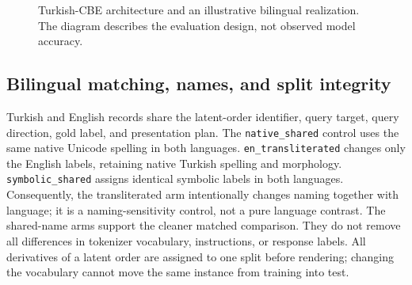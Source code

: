 \begin{figure}[t]
  \caption{Turkish-CBE architecture and an illustrative bilingual realization. The diagram describes the
  evaluation design, not observed model accuracy.}
  \label{fig:architecture}
\end{figure}

\subsection{Bilingual matching, names, and split integrity}

Turkish and English records share the latent-order identifier, query target, query direction, gold label,
and presentation plan. The \texttt{native\_shared} control uses the same native Unicode spelling in both
languages. \texttt{en\_transliterated} changes only the English labels, retaining native Turkish spelling
and morphology. \texttt{symbolic\_shared} assigns identical symbolic labels in both languages.
Consequently, the transliterated arm intentionally changes naming together with language; it is a
naming-sensitivity control, not a pure language contrast. The shared-name arms support the cleaner matched
comparison. They do not remove all differences in tokenizer vocabulary, instructions, or response labels.
All derivatives of a latent order are assigned to one split before rendering; changing the vocabulary cannot
move the same instance from training into test.

